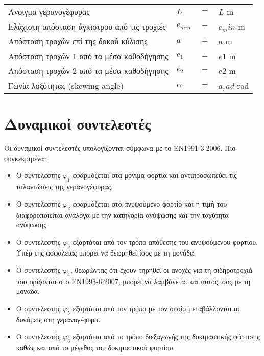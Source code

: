 \begin{tabular}{llcl}
    Άνοιγμα γερανογέφυρας                         &$L$          &$=$ &${{ L }}$ m \\
    Ελάχιστη απόσταση άγκιστρου από τις τροχιές   &$e_{min}$    &$=$ &${{ e_min }}$ m \\
    Απόσταση τροχών επί της δοκού κύλισης         &$a$          &$=$ &${{ a }}$ m \\
    Απόσταση τροχών $1$ από τα μέσα καθοδήγησης   &$e_1$        &$=$ &${{ e1 }}$ m \\
    Απόσταση τροχών $2$ από τα μέσα καθοδήγησης   &$e_2$        &$=$ &${{ e2 }}$ m \\
    Γωνία λοξότητας (skewing angle)               &$α$          &$=$ &${{ a_rad }}$ rad
\end{tabular}

\section{Δυναμικοί συντελεστές}
Οι δυναμικοί συντελεστές υπολογίζονται σύμφωνα με το ΕΝ1991-3:2006. Πιο συγκεκριμένα:
\begin{itemize}
    \item Ο συντελεστής $φ_1$ εφαρμόζεται στα μόνιμα φορτία και αντιπροσωπεύει τις ταλαντώσεις της γερανογέφυρας.
    \item Ο συντελεστής $φ_2$ εφαρμόζεται στο ανυψούμενο φορτίο και η τιμή του διαφοροποιείται ανάλογα με την κατηγορία ανύψωσης και την ταχύτητα ανύψωσης.
    \item Ο συντελεστής $φ_3$ εξαρτάται από τον τρόπο απόθεσης του ανυψούμενου φορτίου.  Υπέρ της ασφαλείας μπορεί να θεωρηθεί ίσος με τη μονάδα.
    \item Ο συντελεστής $φ_4$, θεωρώντας ότι έχουν τηρηθεί οι ανοχές για τη σιδηροτροχιά που ορίζονται στο ΕΝ1993-6:2007, μπορεί να λαμβάνεται και αυτός ίσος με τη μονάδα.
    \item Ο συντελεστής $φ_5$ εξαρτάται από τον τρόπο με τον οποίο μεταβάλλονται οι δυνάμεις στη γερανογέφυρα.
    \item Ο συντελεστής $φ_6$ εξαρτάται από το τρόπο διεξαγωγής της δοκιμαστικής φόρτισης καθώς και από το μέγεθος του δοκιμαστικού φορτίου.
\end{itemize}

